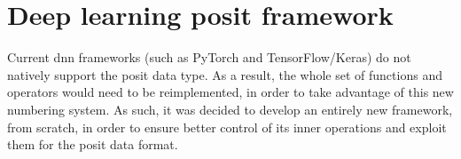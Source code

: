 \documentclass{article}
\begin{document}
	
	
	\section{Deep learning posit framework}
	
	Current \gls{dnn} frameworks (such as PyTorch and TensorFlow/Keras) do not natively support the posit data type. As a result, the whole set of functions and operators would need to be reimplemented, in order to take advantage of this new numbering system. As such, it was decided to develop an entirely new framework, from scratch, in order to ensure better control of its inner operations and exploit them for the posit data format.
	
\end{document}
